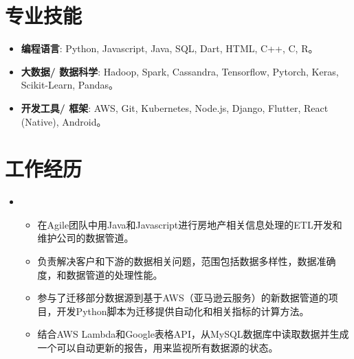 \documentclass[11pt,a4paper,sans]{moderncv}        %
\begin{document}
\makecvtitle
\vspace{-3.5em}
\section{专业技能}

\vspace{2pt}

\begin{itemize}

\item{\textbf{编程语言}: Python, Javascript, Java, SQL, Dart, HTML, C++, C, R。}
\vspace{2pt}
\item{\textbf{大数据/ 数据科学}: Hadoop, Spark, Cassandra, Tensorflow, Pytorch, Keras, Scikit-Learn, Pandas。}
\vspace{2pt}
\item{\textbf{开发工具/ 框架}: AWS, Git, Kubernetes, Node.js, Django, Flutter, React (Native), Android。}
\end{itemize}

\section{工作经历	}

\begin{itemize}
\vspace{2pt}

\item{

\begin{itemize}
\item{在Agile团队中用Java和Javascript进行房地产相关信息处理的ETL开发和维护公司的数据管道。}
\vspace{2pt}
\item{负责解决客户和下游的数据相关问题，范围包括数据多样性，数据准确度，和数据管道的处理性能。}
\vspace{2pt}
\item{参与了迁移部分数据源到基于AWS（亚马逊云服务）的新数据管道的项目，开发Python脚本为迁移提供自动化和相关指标的计算方法。}
\vspace{2pt}
\item{结合AWS Lambda和Google表格API，从MySQL数据库中读取数据并生成一个可以自动更新的报告，用来监视所有数据源的状态。}

\end{itemize}}
\end{itemize}
\end{document}
